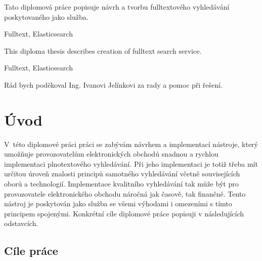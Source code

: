 \documentclass[FM,DP]{tulthesis}
\begin{document}


\begin{abstractCZ}
Tato diplomová práce popisuje návrh a tvorbu fulltextového vyhledávání poskytovaného jako služba.
\end{abstractCZ}

\begin{klicovaslovaCZ}
Fulltext, Elasticsearch
\end{klicovaslovaCZ}

\vspace{2cm}

\begin{abstractEN}
This diploma thesis describes creation of fulltext search service.
\end{abstractEN}

\begin{klicovaslovaEN}
Fulltext, Elasticsearch
\end{klicovaslovaEN}


\begin{acknowledgement}
Rád bych poděkoval Ing. Ivanovi Jelínkovi za rady a pomoc při řešení.
\end{acknowledgement}


\tableofcontents
\clearpage




\chapter{Úvod}

V~této diplomové práci práci se zabývám návrhem a implementací nástroje, který umožňuje
provozovatelům elektronických obchodů snadnou a rychlou implementaci plnotextového vyhledávání. 
Při jeho implementaci je totiž třeba mít určitou úroveň znalosti principů samotného 
vyhledávání včetně souvisejících oborů a technologií. Implementace kvalitního vyhledávání
tak může být pro provozovatele elektronického obchodu náročná jak časově, tak finančně.
Tento nástroj je poskytován jako služba se všemi výhodami i omezeními s tímto principem spojenými. 
Konkrétní cíle diplomové práce popisuji v následujících odstavcích.

\section{Cíle práce}
\end{document}
